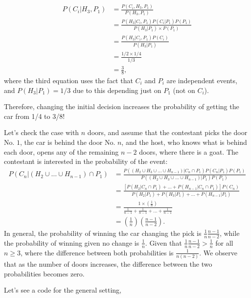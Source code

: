 \begin{enumerate}[leftmargin=*]
\begin{align}
	P(C_i|H_3,P_1)&= \frac{P(C_i,H_3,P_1)}{P(H_3,P_1)}\\
	&= \frac{P(H_3|C_i,P_1)P(C_i|P_1)P(P_1)}{P(H_3|P_1)\times P(P_1)}\nonumber\\
	&= \frac{P(H_3|C_i,P_1)P(C_i)}{P(H_3|P_1)}\nonumber\\
	&=\frac{1/2\times 1/4}{1/3}\nonumber\\
	&=\frac{3}{8},\nonumber
\end{align}
where the third equation uses the fact that $C_i$ and $P_i$ are independent events, and $P(H_3|P_1)=1/3$ due to this depending just on $P_1$ (not on $C_i$).
	
Therefore, changing the initial decision increases the probability of getting the car from 1/4 to 3/8!
	
Let's check the case with $n$ doors, and assume that the contestant picks the door No. $1$, the car is behind the door No. $n$, and the host, who knows what is behind each door, opens any of the remaining $n-2$ doors, where there is a goat. The contestant is interested in the probability of the event:
{\footnotesize{
\begin{align}
	P\left( C_{n} | (H_2 \cup  \ldots \cup H_{n-1}) \cap P_1 \right)  & = 
	\frac{P\left( (H_2 \cup H_3 \cup \ldots \cup H_{n-1}) | C_{n} \cap P_1\right) P(C_{n} | P_1) P(P_1)}{P\left( (H_2 \cup H_3 \cup \ldots \cup H_{n-1}) | P_1 \right) P(P_1)}\nonumber  \\
	& = \frac{\left[ P\left( H_2 | C_{n} \cap P_1\right) + \ldots + P\left( H_{n-1}| C_{n} \cap P_1\right) \right] P(C_{n})}{P\left( H_2 | P_1 \right) + P\left( H_3 | P_1 \right) + \ldots + P\left( H_{n-1} | P_1 \right)} \nonumber\\
	& = \frac{1 \times \left( \frac{1}{n} \right) }{\frac{1}{n-1} + \frac{1}{n-1} + \ldots + \frac{1}{n-1}} \nonumber\\
	& = \left( \frac{1}{n}\right) \left( \frac{n-1}{n-2}\right).
\end{align}
}}	
In general, the probability of winning the car changing the pick is $\frac{1}{n} \frac{n-1}{n-2}$, while the probability of winning given no change is $\frac{1}{n}$. Given that $\frac{1}{n} \frac{n-1}{n-2} > \frac{1}{n}$ for all $n \geq 3$, where the difference between both probabilities is  $\frac{1}{n(n-2)}$. We observe that as the number of doors increases, the difference between the two probabilities becomes zero.
	
Let's see a code for the general setting,


\end{enumerate}
